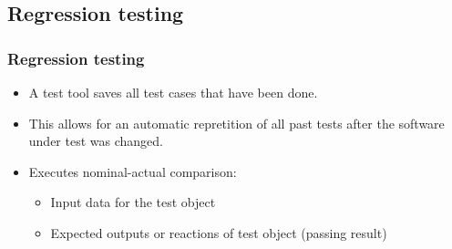 \subsection{Regression testing }


\begin{frame}
\frametitle{Regression testing}
\begin{itemize}
  \item A test tool saves all test cases that have been done.
  \item This allows for an automatic repretition of all past tests after the software under test was changed.
  \item Executes nominal-actual comparison:
    \begin{itemize}
      \item Input data for the test object
      \item Expected outputs or reactions of test object (passing result)
    \end{itemize}
\end{itemize}
\end{frame}




